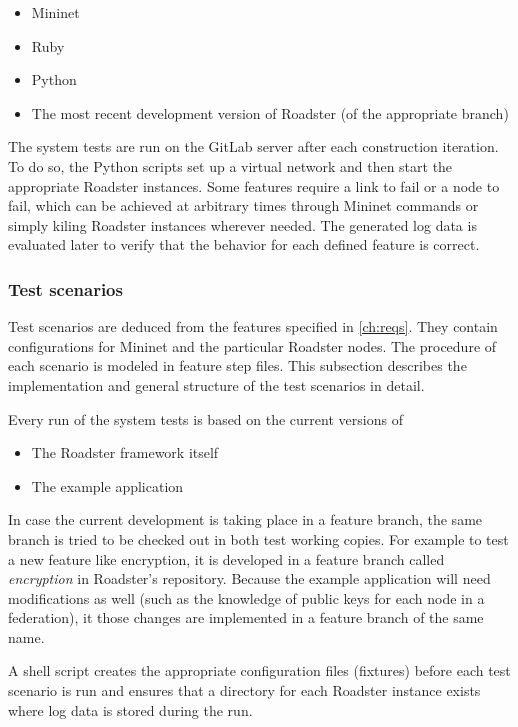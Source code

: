 \begin{itemize}
	\item Mininet
	\item Ruby
	\item Python
	\item The most recent development version of Roadster (of the appropriate branch)
\end{itemize}

The system tests are run on the GitLab server after each construction
iteration. To do so, the Python scripts set up a virtual network and then start
the appropriate Roadster instances. Some features require a link to fail or a
node to fail, which can be achieved at arbitrary times through Mininet commands or
simply kiling Roadster instances wherever needed. The generated log data is
evaluated later to verify that the behavior for each defined feature is
correct.


\subsubsection{Test scenarios}
Test scenarios are deduced from the features specified in \autoref{ch:reqs}.
They contain configurations for Mininet and the particular Roadster nodes.
The procedure of each scenario is modeled in feature step files. This subsection
describes the implementation and general structure of the test scenarios in detail.


Every run of the system tests is based on the current versions of

\begin{itemize}
	\item The Roadster framework itself
	\item The example application
\end{itemize}

In case the current development is taking place in a feature branch, the same
branch is tried to be checked out in both test working copies. For example to
test a new feature like encryption, it is developed in a feature branch called
\emph{encryption} in Roadster's repository. Because the example application
will need modifications as well (such as the knowledge of public keys for each
node in a federation), it those changes are implemented in a feature branch of
the same name.

A shell script creates the appropriate configuration files (fixtures) before
each test scenario is run and ensures that a directory for each Roadster
instance exists where log data is stored during the run.

